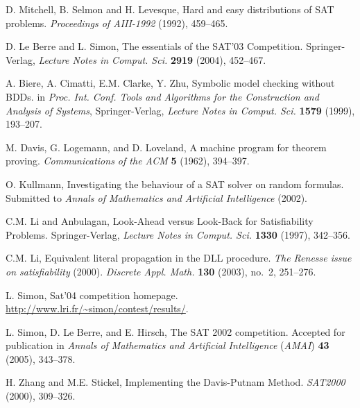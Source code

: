 \documentclass[twoside,11pt]{article}
\begin{document}
\begin{thebibliography}{99}

 D. Mitchell, B. Selmon and H. Levesque,
    {Hard and easy distributions of SAT problems}.
    {\it Proceedings of AIII-1992} (1992), 459--465.

    D. Le Berre and L. Simon,
    {The essentials of the SAT'03 Competition}.
    Springer-Verlag, {\it Lecture Notes in Comput. Sci.} {\bf 2919} (2004), 452--467.

 A. Biere, A. Cimatti, E.M. Clarke, Y. Zhu,
    {Symbolic model checking without BDDs}.
    in {\it Proc. Int. Conf. Tools and Algorithms for the Construction and Analysis of Systems},
    Springer-Verlag, {\it Lecture Notes in Comput. Sci.} {\bf 1579} (1999), 193--207.

 M. Davis, G. Logemann, and D. Loveland,
    {A machine program for theorem proving}.
    {\it Communications of the ACM} {\bf 5} (1962), 394--397.

 O. Kullmann,
    {Investigating the behaviour of a SAT solver on random formulas}.
    Submitted to {\it Annals of Mathematics and Artificial Intelligence} (2002).

 C.M. Li and Anbulagan,
    { Look-Ahead versus Look-Back for Satisfiability Problems}.
    Springer-Verlag, {\it Lecture Notes in Comput. Sci.} {\bf 1330} (1997), 342--356.

 C.M. Li,
    {Equivalent literal propagation in the DLL procedure}.
    {\it The Renesse issue on satisfiability} (2000).
    {\it Discrete Appl. Math.} {\bf 130} (2003), no.~2, 251--276.

 L. Simon,
    {Sat'04 competition homepage}.\\
    \url{http://www.lri.fr/~simon/contest/results/}.

 L. Simon, D. Le Berre, and E. Hirsch,
    { The SAT 2002 competition}.
    Accepted for publication in {\it Annals of Mathematics and
    Artificial Intelligence} ({\it AMAI}) {\bf 43} (2005), 343--378.

H. Zhang and M.E. Stickel, {Implementing the Davis-Putnam Method}.
    {\it SAT2000} (2000), 309--326.
	
	
\end{thebibliography}
\end{document}
